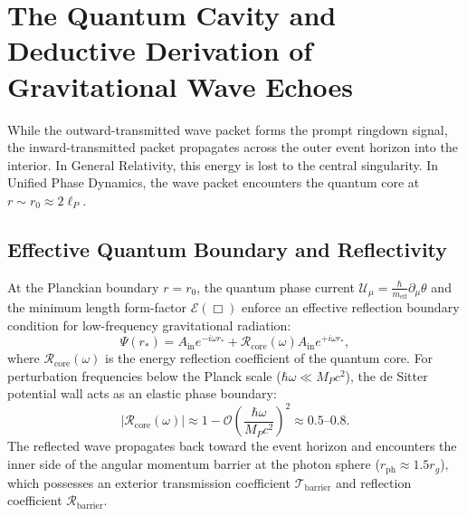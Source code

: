 \documentclass[11pt,a4paper]{article}
\begin{document}
\section{The Quantum Cavity and Deductive Derivation of Gravitational Wave Echoes}

While the outward-transmitted wave packet forms the prompt ringdown signal, the inward-transmitted packet propagates across the outer event horizon into the interior. In General Relativity, this energy is lost to the central singularity. In Unified Phase Dynamics, the wave packet encounters the quantum core at $r \sim r_0 \approx 2\ell_P$.

\subsection{Effective Quantum Boundary and Reflectivity}
At the Planckian boundary $r = r_0$, the quantum phase current $\mathcal{U}_\mu = \frac{\hbar}{m_{\mathrm{eff}}} \partial_\mu \theta$ and the minimum length form-factor $\mathcal{E}(\Box)$ enforce an effective reflection boundary condition for low-frequency gravitational radiation:
\begin{equation}
\Psi(r_*) = A_{\mathrm{in}} e^{-i\omega r_*} + \mathcal{R}_{\mathrm{core}}(\omega) A_{\mathrm{in}} e^{+i\omega r_*},
\end{equation}
where $\mathcal{R}_{\mathrm{core}}(\omega)$ is the energy reflection coefficient of the quantum core. For perturbation frequencies below the Planck scale ($\hbar\omega \ll M_P c^2$), the de Sitter potential wall acts as an elastic phase boundary:
\begin{equation}
|\mathcal{R}_{\mathrm{core}}(\omega)| \approx 1 - \mathcal{O}\left( \frac{\hbar\omega}{M_P c^2} \right)^2 \approx 0.5\text{--}0.8.
\end{equation}
The reflected wave propagates back toward the event horizon and encounters the inner side of the angular momentum barrier at the photon sphere ($r_{\mathrm{ph}} \approx 1.5 r_g$), which possesses an exterior transmission coefficient $\mathcal{T}_{\mathrm{barrier}}$ and reflection coefficient $\mathcal{R}_{\mathrm{barrier}}$.
\end{document}
